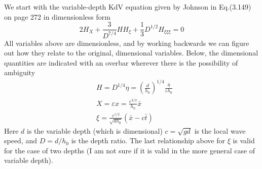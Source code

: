 \documentclass[12pt]{article}
\newcommand{\eps}{\varepsilon}
\begin{document}
We start with the variable-depth KdV equation given by Johnson in Eq.(3.149) on page 272 in dimensionless form 
\begin{equation}
\label{varKdVJohnson}
2 H_X + \frac{3}{D^{7/4}} H H_\xi + \frac{1}{3} D^{1/2} H_{\xi \xi \xi} = 0
\end{equation}
All variables above are dimensionless, and by working backwards we can figure out how they relate to the original, dimensional variables. Below, the dimensional quantities are indicated with an overbar wherever there is the possibility of ambiguity
\begin{align}
& H = D^{1/4} \eta = \left( \frac{d}{h_0} \right)^{1/4} \frac{\bar{\eta}}{\eps h_0} \\
& X = \eps x = \frac{\eps^{3/2}}{h_0} \bar{x} \\
& \xi = \frac{\eps^{1/2}}{\sqrt{d h_0}} (\bar{x} - c \bar{t})
\end{align}
Here $d$ is the variable depth (which is dimensional) $c = \sqrt{g d}$ is the local wave speed, and $D = d/h_0$ is the depth ratio. The last relationship above for $\xi$ is valid for the case of two depths (I am not sure if it is valid in the more general case of variable depth).
\end{document}
